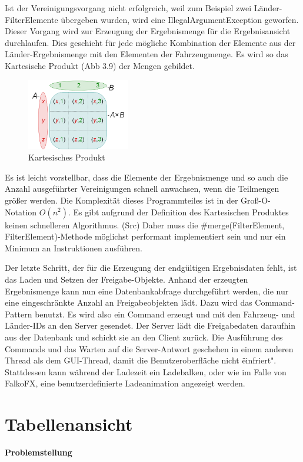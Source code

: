 Ist der Vereinigungsvorgang nicht erfolgreich, weil zum Beispiel zwei Länder-FilterElemente übergeben wurden, wird eine IllegalArgumentException geworfen.
Dieser Vorgang wird zur Erzeugung der Ergebnismenge für die Ergebnisansicht durchlaufen. Dies geschieht für jede mögliche Kombination der Elemente aus der Länder-Ergebnismenge mit den Elementen der Fahrzeugmenge. Es wird so das Kartesische Produkt (Abb 3.9) der Mengen gebildet.

\begin{figure}[H]
 \centering
 \includegraphics[width=0.4\textwidth]{grafiken/Multi_Kartesisches.png}
 \caption{Kartesisches Produkt}
 \label{fig:multiFilter4}
\end{figure}

Es ist leicht vorstellbar, dass die Elemente der Ergebnismenge und so auch die Anzahl ausgeführter Vereinigungen schnell anwachsen, wenn die Teilmengen größer werden. Die Komplexität dieses Programmteiles ist in der Groß-O-Notation $O(n^2)$. Es gibt aufgrund der Definition des Kartesischen Produktes keinen schnelleren Algorithmus. (Src) Daher muss die \#merge(FilterElement, FilterElement)-Methode möglichst performant implementiert sein und nur ein Minimum an Instruktionen ausführen.

Der letzte Schritt, der für die Erzeugung der endgültigen Ergebnisdaten fehlt, ist das Laden und Setzen der Freigabe-Objekte. Anhand der erzeugten Ergebnismenge kann nun eine Datenbankabfrage durchgeführt werden, die nur eine eingeschränkte Anzahl an Freigabeobjekten lädt. Dazu wird das Command-Pattern benutzt. Es wird also ein Command erzeugt und mit den Fahrzeug- und Länder-IDs an den Server gesendet. Der Server lädt die Freigabedaten daraufhin aus der Datenbank und schickt sie an den Client zurück. Die Ausführung des Commands und das Warten auf die Server-Antwort geschehen in einem anderen Thread als dem GUI-Thread, damit die Benutzeroberfläche nicht \"einfriert". Stattdessen kann während der Ladezeit ein Ladebalken, oder wie im Falle von FalkoFX, eine benutzerdefinierte Ladeanimation angezeigt werden.

\section{Tabellenansicht} \label{sec:implTabelle}
\textbf{Problemstellung}

